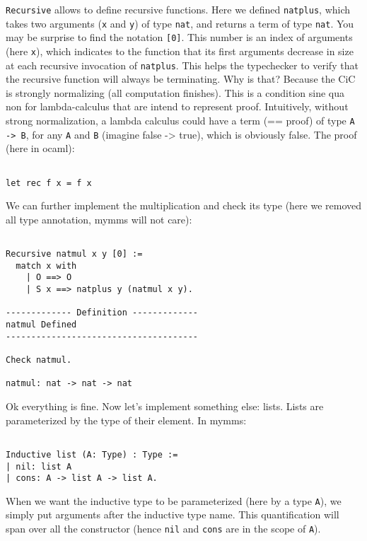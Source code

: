 \documentclass[a4paper,5pt,onecolumn]{article}
\begin{document}
\texttt{Recursive} allows to define recursive functions. Here we
defined \texttt{natplus}, which takes two arguments (\texttt{x} and
\texttt{y}) of type \texttt{nat}, and returns a term of type
\texttt{nat}. You may be surprise to find the notation
\texttt{[0]}. This number is an index of arguments (here \texttt{x}),
which indicates to the function that its first arguments decrease in
size at each recursive invocation of \texttt{natplus}. This helps the
typechecker to verify that the recursive function will always be
terminating. Why is that? Because the CiC is strongly normalizing (all
computation finishes). This is a condition sine qua non for
lambda-calculus that are intend to represent proof. Intuitively,
without strong normalization, a lambda calculus could have a term (==
proof) of type \texttt{A -> B}, for any \texttt{A} and \texttt{B}
(imagine false -> true), which is obviously false. The proof (here in
ocaml):

\begin{verbatim}

let rec f x = f x

\end{verbatim}

We can further implement the multiplication and check its type (here
we removed all type annotation, mymms will not care):

\begin{verbatim}

Recursive natmul x y [0] :=
  match x with
    | O ==> O
    | S x ==> natplus y (natmul x y).

------------- Definition -------------
natmul Defined
--------------------------------------

Check natmul.

natmul: nat -> nat -> nat

\end{verbatim}

Ok everything is fine. Now let's implement something else:
lists. Lists are parameterized by the type of their element. In mymms:

\begin{verbatim}

Inductive list (A: Type) : Type :=
| nil: list A
| cons: A -> list A -> list A.

\end{verbatim}

When we want the inductive type to be parameterized (here by a type
\texttt{A}), we simply put arguments after the inductive type
name. This quantification will span over all the constructor (hence
\texttt{nil} and \texttt{cons} are in the scope of \texttt{A}).
\end{document}

